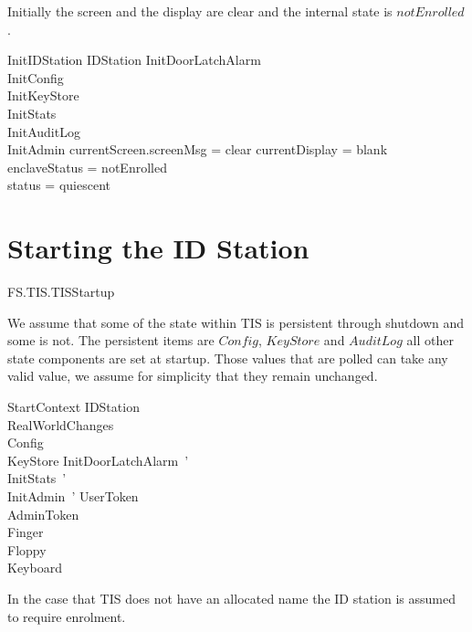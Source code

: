 Initially the screen and the display are clear and the internal state
is $notEnrolled$.

\begin{schema}{InitIDStation}
        IDStation
\also
	InitDoorLatchAlarm
\\	InitConfig
\\      InitKeyStore
\\      InitStats
\\      InitAuditLog
\\      InitAdmin
\where
        currentScreen.screenMsg = clear
\also
	currentDisplay = blank
\\	enclaveStatus = notEnrolled
\\      status = quiescent
\end{schema}

\section{Starting the ID Station}
\begin{traceunit}{FS.TIS.TISStartup}
\end{traceunit}


We assume that some of the state within TIS is persistent through
shutdown and some is not. 
The persistent items are $Config$, $KeyStore$ and $AuditLog$ all other state
components are set at startup. Those values that are polled can take
any valid value, we assume for simplicity that they remain unchanged.

\begin{schema}{StartContext}
        \Delta IDStation
\\      RealWorldChanges
\also
\\      \Xi Config
\\      \Xi KeyStore
\also
	InitDoorLatchAlarm~'
\\      InitStats~'
\\      InitAdmin~'
\also
        \Xi UserToken  
\\      \Xi AdminToken 
\\      \Xi Finger 
\\      \Xi Floppy 
\\      \Xi Keyboard 
\end{schema}

In the case that TIS does not have an allocated name the ID station is
assumed to require enrolment.

